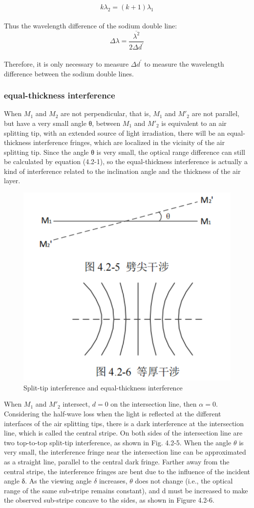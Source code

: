 \documentclass[UTF8]{article}
\begin{document}
\[k\lambda _{2} =(k+1)\lambda _{1}\]\\ 

Thus the wavelength difference of the sodium double line:\\

\[\Delta \lambda =\frac{\overline{{\lambda^{2}  } } }{2\Delta d^{'} }\]\\

Therefore, it is only necessary to measure $\Delta d^{'}$ to measure the wavelength difference between the sodium double lines.
	
 \subsubsection{equal-thickness interference}
When $M_1$ and $M_2$ are not perpendicular, that is, $M_1$ and $M'_2$ are not parallel, but have a very small angle θ, between $M_1$ and $M'_2$ is equivalent to an air splitting tip, with an extended source of light irradiation, there will be an equal-thickness interference fringes, which are localized in the vicinity of the air splitting tip. Since the angle θ is very small, the optical range difference can still be calculated by equation (4.2-1), so the equal-thickness interference is actually a kind of interference related to the inclination angle and the thickness of the air layer.

\begin{figure}
    \centering
    \includegraphics[width=0.5\linewidth]{FIG7.png}
    \caption{Split-tip interference and equal-thickness interference}
\end{figure}

When $M_1$ and $M'_2$ intersect, $d=0$ on the intersection line, then $\alpha=0$. Considering the half-wave loss when the light is reflected at the different interfaces of the air splitting tips, there is a dark interference at the intersection line, which is called the central stripe. On both sides of the intersection line are two top-to-top split-tip interference, as shown in Fig. 4.2-5. When the angle $\theta$ is very small, the interference fringe near the intersection line can be approximated as a straight line, parallel to the central dark fringe. Farther away from the central stripe, the interference fringes are bent due to the influence of the incident angle δ. As the viewing angle $\delta$ increases, $\theta$ does not change (i.e., the optical range of the same sub-stripe remains constant), and d must be increased to make the observed sub-stripe concave to the sides, as shown in Figure 4.2-6.\\
\end{document}
